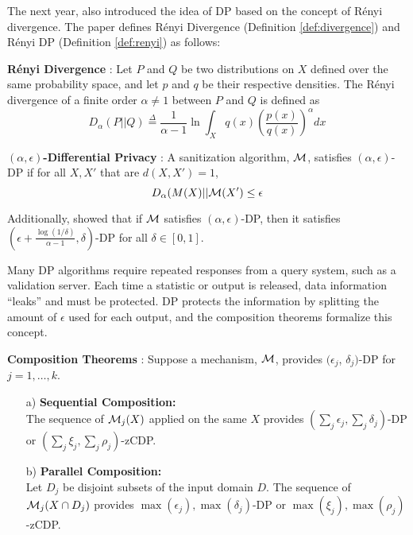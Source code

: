 The next year, \cite{mironov2017renyi} also introduced the idea of DP based on the concept of R\'enyi divergence. The paper defines R\'enyi Divergence (Definition \ref{def:divergence}) and R\'enyi DP (Definition \ref{def:renyi}) as follows:

\begin{defn}\label{def:divergence} \textbf{R\'enyi Divergence} \autocite{renyi1961measures}: Let $P$ and $Q$ be two distributions on $X$ defined over the same probability space, and let $p$ and $q$ be their respective densities. The R\'enyi divergence of a finite order $\alpha\neq1$ between $P$ and $Q$ is defined as
    \begin{equation}
        D_\alpha(P||Q)\stackrel{\Delta}{=}\frac{1}{\alpha-1}\ln\int_X q(x)\left(\frac{p(x)}{q(x)}\right)^\alpha dx
    \end{equation}
\end{defn}

\begin{defn}\label{def:renyi} \textbf{$(\alpha, \epsilon)$-Differential Privacy} \autocite{mironov2017renyi}: A sanitization algorithm, $\mathcal{M}$, satisfies $(\alpha, \epsilon)$-DP if for all $X, X'$ that are $d(X,X')=1$,
    \begin{equation}
        D_\alpha(M(X)||\mathcal{M}(X')\leq\epsilon
    \end{equation}
\end{defn}

Additionally, \cite{mironov2017renyi} showed that if $\mathcal{M}$ satisfies $(\alpha,\epsilon)$-DP, then it satisfies $\left(\epsilon + \frac{\log(1/\delta)}{\alpha-1}, \delta \right)$-DP for all $\delta\in[0,1]$.

Many DP algorithms require repeated responses from a query system, such as a validation server. Each time a statistic or output is released, data information ``leaks'' and must be protected. DP protects the information by splitting the amount of $\epsilon$ used for each output, and the composition theorems formalize this concept.

\begin{thm}\label{thm:comp} \textbf{Composition Theorems} \autocite{mcsherry2009privacy,dwork2016concentrated,bun2016concentrated}:
Suppose a mechanism, $\mathcal{M}$, provides $(\epsilon_j$, $\delta_j)$-DP for $j=1,\ldots,k$.
  \begin{itemize}\setlength{\itemindent}{15pt}
  \item[a)] \textbf{Sequential Composition:}\\
    The sequence of $\mathcal{M}_j(X)$ applied on the same $X$ provides $(\sum_j\epsilon_j,\sum_j\delta_j)$-DP or $(\sum_j\xi_j,\sum_j\rho_j)$-zCDP.
  \item[b)] \textbf{Parallel Composition:}\\
    Let  $D_j$ be disjoint subsets of the input domain $D$. The sequence of $\mathcal{M}_j(X\cap D_j)$ provides $\max(\epsilon_j), \max(\delta_j)$-DP or $\max(\xi_j), \max(\rho_j)$-zCDP.
  \end{itemize}
\end{thm}

